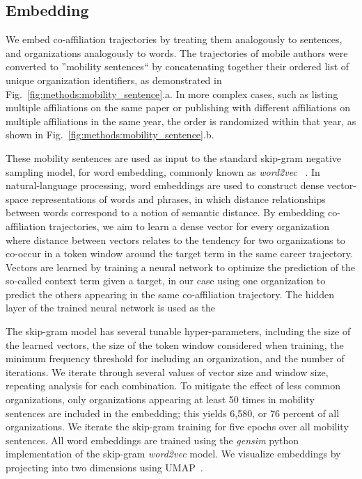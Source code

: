 \documentclass[12pt]{article} %
\begin{document}
\subsection*{Embedding}
We embed co-affiliation trajectories by treating them analogously to sentences, and organizations analogously to words.
The trajectories of mobile authors were converted to ''mobility sentences`` by concatenating together their ordered list of unique organization identifiers, as demonstrated in Fig.~\ref{fig:methods:mobility_sentence}.a.
In more complex cases, such as listing multiple affiliations on the same paper or publishing with different affiliations on multiple affiliations in the same year, the order is randomized within that year, as shown in  Fig.~\ref{fig:methods:mobility_sentence}.b.

These mobility sentences are used as input to the standard skip-gram negative sampling model, for word embedding, commonly known as \textit{word2vec}~\autocite{mikolov2013word2vec} .
In natural-language processing, word embeddings are used to construct dense vector-space representations of words and phrases, in which distance relationships between words correspond to a notion of semantic distance.
By embedding co-affiliation trajectories, we aim to learn a dense vector for every organization where distance between vectors relates to the tendency for two organizations to co-occur in a token window around the target term in the same career trajectory.
Vectors are learned by training a neural network to optimize the prediction of the so-called context term given a target, in our case using one organization to predict the others appearing in the same co-affiliation trajectory.
The hidden layer of the trained neural network is used as the

The skip-gram model has several tunable hyper-parameters, including the size of the learned vectors, the size of the token window  considered when training, the minimum frequency threshold for including an organization, and the number of iterations.
We iterate through several values of vector size and window size, repeating analysis for each combination.
To mitigate the effect of less common organizations, only organizations appearing at least 50 times in mobility sentences are included in the embedding;
this yields 6,580, or 76 percent of all organizations.
We iterate the skip-gram training for five epochs over all mobility sentences.
All word embeddings are trained using the \textit{gensim} python implementation of the skip-gram \textit{word2vec} model.
We visualize embeddings by projecting into two dimensions using UMAP~\autocite{mcinnes2018umap}.
\end{document}
